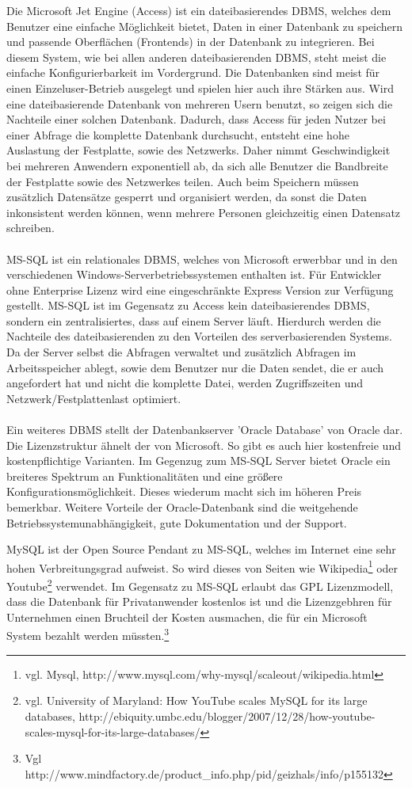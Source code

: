 Die Microsoft Jet Engine (Access) ist ein dateibasierendes DBMS, welches dem Benutzer eine einfache Möglichkeit bietet, Daten in einer Datenbank zu speichern und passende Oberflächen (Frontends) in der Datenbank zu integrieren.
Bei diesem System, wie bei allen anderen dateibasierenden DBMS, steht meist die einfache Konfigurierbarkeit im Vordergrund. Die Datenbanken sind meist für einen Einzeluser-Betrieb ausgelegt und spielen hier auch ihre Stärken aus.
Wird eine dateibasierende Datenbank von mehreren Usern benutzt, so zeigen sich die Nachteile einer solchen Datenbank.
Dadurch, dass Access für jeden Nutzer bei einer Abfrage die komplette Datenbank durchsucht, entsteht eine hohe Auslastung der Festplatte, sowie des Netzwerks. Daher nimmt Geschwindigkeit bei mehreren Anwendern exponentiell ab, da sich alle Benutzer die Bandbreite der Festplatte sowie des Netzwerkes teilen.
Auch beim Speichern müssen zusätzlich Datensätze gesperrt und organisiert werden, da sonst die Daten inkonsistent werden können, wenn mehrere Personen gleichzeitig einen Datensatz schreiben.\\\\
MS-SQL ist ein relationales DBMS, welches von Microsoft erwerbbar
und in den verschiedenen Windows-Serverbetriebssystemen enthalten ist.
Für Entwickler ohne Enterprise Lizenz wird eine eingeschränkte Express Version zur Verfügung gestellt.
MS-SQL ist im Gegensatz zu Access kein dateibasierendes DBMS, sondern ein zentralisiertes, dass auf einem Server läuft.
Hierdurch werden die Nachteile des dateibasierenden zu den Vorteilen des serverbasierenden Systems.
Da der Server selbst die Abfragen verwaltet und zusätzlich Abfragen im Arbeitsspeicher ablegt, sowie dem Benutzer nur die Daten
sendet, die er auch angefordert hat und nicht die komplette Datei, werden Zugriffszeiten
und Netzwerk/Festplattenlast optimiert.\\\\
Ein weiteres DBMS stellt der Datenbankserver 'Oracle Database' von Oracle dar.
Die Lizenzstruktur ähnelt der von Microsoft.
So gibt es auch hier kostenfreie und kostenpflichtige Varianten.
Im Gegenzug zum MS-SQL Server bietet Oracle ein breiteres Spektrum an Funktionalitäten und eine größere Konfigurationsmöglichkeit.
Dieses wiederum macht sich im höheren Preis bemerkbar.
Weitere Vorteile der Oracle-Datenbank sind die weitgehende Betriebssystemunabhängigkeit, gute Dokumentation und der Support.

MySQL ist der Open Source Pendant zu MS-SQL, welches im Internet eine sehr hohen Verbreitungsgrad aufweist.
So wird dieses von Seiten wie Wikipedia\footnote{vgl. Mysql, http://www.mysql.com/why-mysql/scaleout/wikipedia.html} oder
Youtube\footnote{vgl. University of Maryland: How YouTube scales MySQL for its large databases, http://ebiquity.umbc.edu/blogger/2007/12/28/how-youtube-scales-mysql-for-its-large-databases/} verwendet.
Im Gegensatz zu MS-SQL erlaubt das GPL Lizenzmodell, dass die Datenbank für Privatanwender kostenlos ist und die Lizenzgebhren für Unternehmen einen Bruchteil der Kosten ausmachen, die für ein Microsoft System bezahlt werden müssten.\footnote{Vgl http://www.mindfactory.de/product\_info.php/pid/geizhals/info/p155132}

